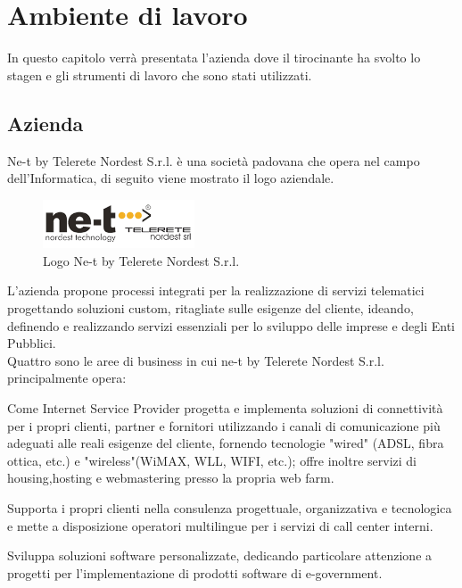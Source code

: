 \clearpage\null\newpage
\section{Ambiente di lavoro}
In questo capitolo verrà presentata l'azienda dove il tirocinante ha svolto lo stagen e gli strumenti di lavoro che sono stati utilizzati.
\subsection{Azienda}

Ne-t by Telerete Nordest S.r.l. è una società padovana che opera nel campo dell'Informatica, di seguito viene mostrato il logo aziendale. \\

\begin{figure}[H]
\centering
\includegraphics[width=0.4\textwidth]{images/netlogo.png}
\caption{Logo Ne-t by Telerete Nordest S.r.l.}
\end{figure}

L'azienda propone processi integrati per la realizzazione di servizi telematici progettando soluzioni custom, ritagliate sulle esigenze del cliente, ideando, definendo e realizzando servizi essenziali per lo sviluppo delle imprese e degli Enti Pubblici. \\

Quattro sono le aree di business in cui ne-t by Telerete Nordest
S.r.l. principalmente opera:

Come Internet Service Provider progetta e implementa soluzioni di connettività per i propri clienti, partner e fornitori utilizzando i canali di comunicazione più adeguati alle reali esigenze del cliente, fornendo tecnologie "wired" (ADSL, fibra ottica, etc.) e "wireless"(WiMAX, WLL, WIFI, etc.); offre inoltre  servizi di housing,hosting e webmastering presso la propria web farm.

Supporta i propri clienti nella consulenza progettuale, organizzativa e tecnologica e mette a disposizione operatori multilingue per i servizi di call
center interni.

Sviluppa soluzioni software personalizzate, dedicando particolare attenzione a progetti per l'implementazione di prodotti software di e-government.

